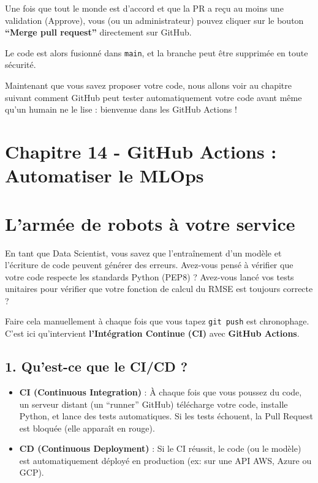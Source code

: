 \documentclass[
  letterpaper,
  DIV=11,
  numbers=noendperiod]{scrreprt}
\providecommand{\tightlist}{%
  \setlength{\itemsep}{0pt}\setlength{\parskip}{0pt}}
\begin{document}
Une fois que tout le monde est d'accord et que la PR a reçu au moins une
validation (Approve), vous (ou un administrateur) pouvez cliquer sur le
bouton \textbf{``Merge pull request''} directement sur GitHub.

Le code est alors fusionné dans \texttt{main}, et la branche peut être
supprimée en toute sécurité.

Maintenant que vous savez proposer votre code, nous allons voir au
chapitre suivant comment GitHub peut tester automatiquement votre code
avant même qu'un humain ne le lise : bienvenue dans les GitHub Actions !


\section{Chapitre 14 - GitHub Actions : Automatiser le
MLOps}\label{chapitre-14---github-actions-automatiser-le-mlops}


\section{L'armée de robots à votre
service}\label{larmuxe9e-de-robots-uxe0-votre-service}

En tant que Data Scientist, vous savez que l'entraînement d'un modèle et
l'écriture de code peuvent générer des erreurs. Avez-vous pensé à
vérifier que votre code respecte les standards Python (PEP8) ? Avez-vous
lancé vos tests unitaires pour vérifier que votre fonction de calcul du
RMSE est toujours correcte ?

Faire cela manuellement à chaque fois que vous tapez \texttt{git\ push}
est chronophage. C'est ici qu'intervient \textbf{l'Intégration Continue
(CI)} avec \textbf{GitHub Actions}.

\subsection{1. Qu'est-ce que le CI/CD ?}\label{quest-ce-que-le-cicd}

\begin{itemize}
\tightlist
\item
  \textbf{CI (Continuous Integration)} : À chaque fois que vous poussez
  du code, un serveur distant (un ``runner'' GitHub) télécharge votre
  code, installe Python, et lance des tests automatiques. Si les tests
  échouent, la Pull Request est bloquée (elle apparaît en rouge).
\item
  \textbf{CD (Continuous Deployment)} : Si le CI réussit, le code (ou le
  modèle) est automatiquement déployé en production (ex: sur une API
  AWS, Azure ou GCP).
\end{itemize}
\end{document}
